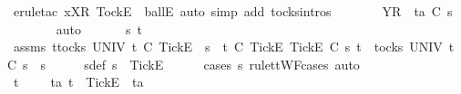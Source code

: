 \ {\isacharparenleft}erule{\isacharunderscore}tac\ x{\isacharequal}{\isachardoublequoteopen}{\isacharbrackleft}{\isacharbrackleft}X{\isacharbrackright}\isactrlsub R{\isacharcomma}\ {\isacharbrackleft}Tock{\isacharbrackright}\isactrlsub E{\isacharbrackright}{\isachardoublequoteclose}\ \ ballE{\isacharcomma}\ auto\ simp\ add{\isacharcolon}\ tocks{\isachardot}intros{\isacharparenright}\isanewline
\ \ \ \ \isamarkupfalse%
\ \isamarkupfalse%
\ {\isachardoublequoteopen}{\isacharbrackleft}Y{\isacharbrackright}\isactrlsub R\ {\isacharhash}\ ta\ {\isasymle}\isactrlsub C\ s{}{\isacharprime}{\isachardoublequoteclose}\isanewline
\ \ \ \ \ \ \isamarkupfalse%
\ auto\isanewline
\ \ \isamarkupfalse%
\isanewline
{}\isamarkupfalse%
\isanewline
\ \ \isamarkupfalse%
\ s{}{\isacharprime}\ t\isanewline
\ \ \isamarkupfalse%
\ assms{\isacharcolon}\ {\isachardoublequoteopen}{\isasymforall}t{\isasymin}tocks\ UNIV{\isachardot}\ t\ {\isasymle}\isactrlsub C\ {\isacharbrackleft}{\isacharbrackleft}Tick{\isacharbrackright}\isactrlsub E{\isacharbrackright}\ {\isacharat}\ s{}\ {\isasymlongrightarrow}\ t\ {\isasymle}\isactrlsub C\ {\isacharbrackleft}{\isacharbrackleft}Tick{\isacharbrackright}\isactrlsub E{\isacharbrackright}{\isachardoublequoteclose}\ {\isachardoublequoteopen}{\isacharbrackleft}{\isacharbrackleft}Tick{\isacharbrackright}\isactrlsub E{\isacharbrackright}\ {\isasymsubseteq}\isactrlsub C\ s{}{\isacharprime}{\isachardoublequoteclose}\ {\isachardoublequoteopen}t\ {\isasymin}\ tocks\ UNIV{\isachardoublequoteclose}\ {\isachardoublequoteopen}t\ {\isasymle}\isactrlsub C\ s{}{\isacharprime}\ {\isacharat}\ s{}{\isachardoublequoteclose}\isanewline
\ \ \isamarkupfalse%
\ \isamarkupfalse%
\ s{}{\isacharprime}{\isacharunderscore}def{\isacharcolon}\ {\isachardoublequoteopen}s{}{\isacharprime}\ {\isacharequal}\ {\isacharbrackleft}{\isacharbrackleft}Tick{\isacharbrackright}\isactrlsub E{\isacharbrackright}{\isachardoublequoteclose}\isanewline
\ \ \ \ \isamarkupfalse%
\ {\isacharparenleft}cases\ s{}{\isacharprime}\ rule{\isacharcolon}ttWF{\isachardot}cases{\isacharcomma}\ auto{\isacharparenright}\isanewline
\ \ \isamarkupfalse%
\ \isamarkupfalse%
\ {\isachardoublequoteopen}t\ {\isacharequal}\ {\isacharbrackleft}{\isacharbrackright}\ {\isasymor}\ {\isacharparenleft}{\isasymexists}\ ta{\isachardot}\ t\ {\isacharequal}\ {\isacharbrackleft}Tick{\isacharbrackright}\isactrlsub E\ {\isacharhash}\ ta{\isacharparenright}{\isachardoublequoteclose}\isanewline
